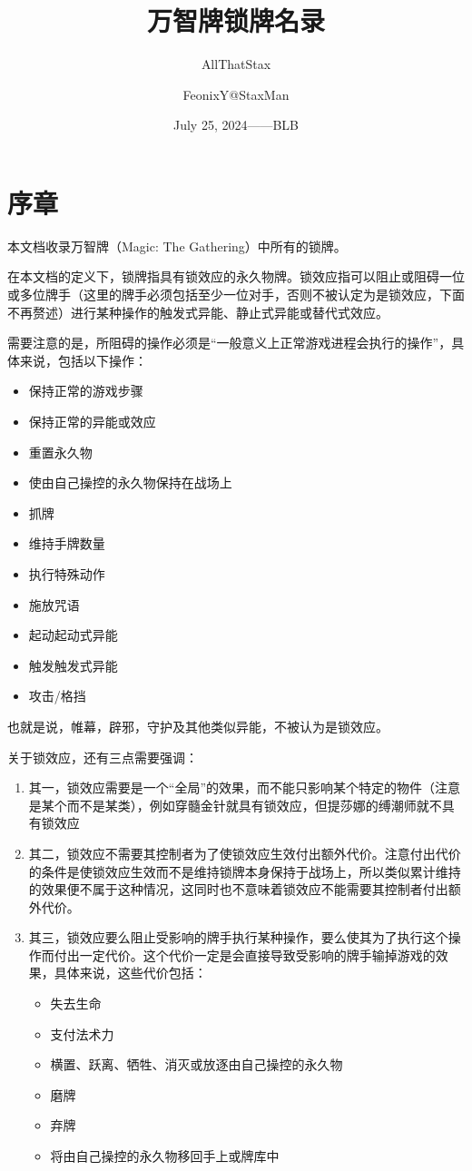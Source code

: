 \documentclass[lang = cn, color = black, 10pt]{AllThatStax}
\title{万智牌锁牌名录}
\subtitle{AllThatStax}
\author{FeonixY@StaxMan}
\date{July 25, 2024——BLB}
\begin{document}
\maketitle
\frontmatter

\chapter*{序章}

本文档收录万智牌（Magic: The Gathering）中所有的锁牌。

在本文档的定义下，锁牌指具有锁效应的永久物牌。锁效应指可以阻止或阻碍一位或多位牌手（这里的牌手必须包括至少一位对手，否则不被认定为是锁效应，下面不再赘述）进行某种操作的触发式异能、静止式异能或替代式效应。

需要注意的是，所阻碍的操作必须是“一般意义上正常游戏进程会执行的操作”，具体来说，包括以下操作：

\begin{itemize}
	\item 保持正常的游戏步骤
	\item 保持正常的异能或效应
	\item 重置永久物
	\item 使由自己操控的永久物保持在战场上
	\item 抓牌
	\item 维持手牌数量
	\item 执行特殊动作
	\item 施放咒语
	\item 起动起动式异能
	\item 触发触发式异能
	\item 攻击/格挡
\end{itemize}

也就是说，帷幕，辟邪，守护及其他类似异能，不被认为是锁效应。

关于锁效应，还有三点需要强调：

\begin{enumerate}
	\item 其一，锁效应需要是一个“全局”的效果，而不能只影响某个特定的物件（注意是某个而不是某类），例如穿髓金针就具有锁效应，但提莎娜的缚潮师就不具有锁效应
	\item 其二，锁效应不需要其控制者为了使锁效应生效付出额外代价。注意付出代价的条件是使锁效应生效而不是维持锁牌本身保持于战场上，所以类似累计维持的效果便不属于这种情况，这同时也不意味着锁效应不能需要其控制者付出额外代价。
	\item 其三，锁效应要么阻止受影响的牌手执行某种操作，要么使其为了执行这个操作而付出一定代价。这个代价一定是会直接导致受影响的牌手输掉游戏的效果，具体来说，这些代价包括：
		\begin{itemize}
			\item 失去生命
			\item 支付法术力
			\item 横置、跃离、牺牲、消灭或放逐由自己操控的永久物
			\item 磨牌
			\item 弃牌
			\item 将由自己操控的永久物移回手上或牌库中
		\end{itemize}
\end{enumerate}
\end{document}
